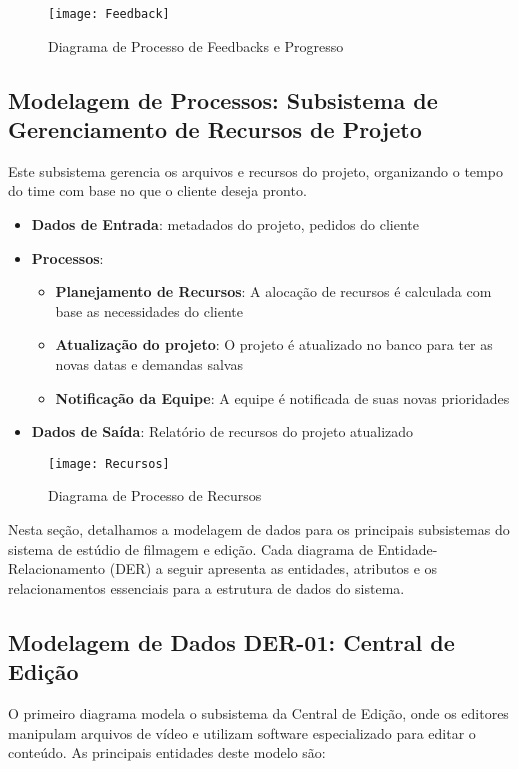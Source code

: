 \begin{figure}[ht]
    \centering
    \texttt{[image: Feedback]}
    \caption{Diagrama de Processo de Feedbacks e Progresso}
    \label{fig:diagram1}
\end{figure}

\pagebreak
\newpage

\subsection{Modelagem de Processos: Subsistema de Gerenciamento de Recursos de Projeto}
Este subsistema gerencia os arquivos e recursos do projeto, organizando o tempo do time com base no que o cliente deseja pronto.

\begin{itemize}
    \item \textbf{Dados de Entrada}: metadados do projeto, pedidos do cliente
    \item \textbf{Processos}:
        \begin{itemize}
            \item \textbf{Planejamento de Recursos}: A alocação de recursos é calculada com base as necessidades do cliente
            \item \textbf{Atualização do projeto}: O projeto é atualizado no banco para ter as novas datas e demandas salvas
            \item \textbf{Notificação da Equipe}: A equipe é notificada de suas novas prioridades
        \end{itemize}
    \item \textbf{Dados de Saída}: Relatório de recursos do projeto atualizado
\end{itemize}

\begin{figure}[ht]
    \centering
    \texttt{[image: Recursos]}
    \caption{Diagrama de Processo de Recursos}
    \label{fig:diagram1}
\end{figure}

\pagebreak
\newpage

Nesta seção, detalhamos a modelagem de dados para os principais subsistemas do sistema de estúdio de filmagem e edição. Cada diagrama de Entidade-Relacionamento (DER) a seguir apresenta as entidades, atributos e os relacionamentos essenciais para a estrutura de dados do sistema.

\subsection{Modelagem de Dados DER-01: Central de Edição}
O primeiro diagrama modela o subsistema da Central de Edição, onde os editores manipulam arquivos de vídeo e utilizam software especializado para editar o conteúdo. As principais entidades deste modelo são:

